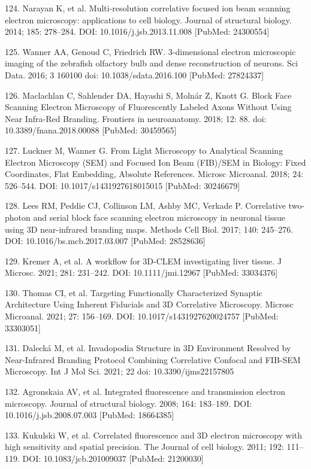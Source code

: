 \documentclass{article}
\begin{document}
\begin{hangpars}
124. Narayan K, et al. Multi-resolution correlative focused ion beam scanning electron microscopy: applications to cell biology. Journal of structural biology. 2014; 185: 278–284. DOI: 10.1016/j.jsb.2013.11.008 [PubMed: 24300554]

125. Wanner AA, Genoud C, Friedrich RW. 3-dimensional electron microscopic imaging of the zebrafish olfactory bulb and dense reconstruction of neurons. Sci Data. 2016; 3 160100 doi: 10.1038/sdata.2016.100 [PubMed: 27824337]

126. Maclachlan C, Sahlender DA, Hayashi S, Molnár Z, Knott G. Block Face Scanning Electron Microscopy of Fluorescently Labeled Axons Without Using Near Infra-Red Branding. Frontiers in neuroanatomy. 2018; 12: 88. doi: 10.3389/fnana.2018.00088 [PubMed: 30459565]

127. Luckner M, Wanner G. From Light Microscopy to Analytical Scanning Electron Microscopy (SEM) and Focused Ion Beam (FIB)/SEM in Biology: Fixed Coordinates, Flat Embedding, Absolute References. Microsc Microanal. 2018; 24: 526–544. DOI: 10.1017/s1431927618015015 [PubMed: 30246679]

128. Lees RM, Peddie CJ, Collinson LM, Ashby MC, Verkade P. Correlative two-photon and serial block face scanning electron microscopy in neuronal tissue using 3D near-infrared branding maps. Methods Cell Biol. 2017; 140: 245–276. DOI: 10.1016/bs.mcb.2017.03.007 [PubMed: 28528636]

129. Kremer A, et al. A workflow for 3D-CLEM investigating liver tissue. J Microsc. 2021; 281: 231–242. DOI: 10.1111/jmi.12967 [PubMed: 33034376]

130. Thomas CI, et al. Targeting Functionally Characterized Synaptic Architecture Using Inherent Fiducials and 3D Correlative Microscopy. Microsc Microanal. 2021; 27: 156–169. DOI: 10.1017/s1431927620024757 [PubMed: 33303051]

131. Dalecká M, et al. Invadopodia Structure in 3D Environment Resolved by Near-Infrared Branding Protocol Combining Correlative Confocal and FIB-SEM Microscopy. Int J Mol Sci. 2021; 22 doi: 10.3390/ijms22157805

132. Agronskaia AV, et al. Integrated fluorescence and transmission electron microscopy. Journal of structural biology. 2008; 164: 183–189. DOI: 10.1016/j.jsb.2008.07.003 [PubMed: 18664385]

133. Kukulski W, et al. Correlated fluorescence and 3D electron microscopy with high sensitivity and spatial precision. The Journal of cell biology. 2011; 192: 111–119. DOI: 10.1083/jcb.201009037 [PubMed: 21200030]


\end{hangpars}
\end{document}
